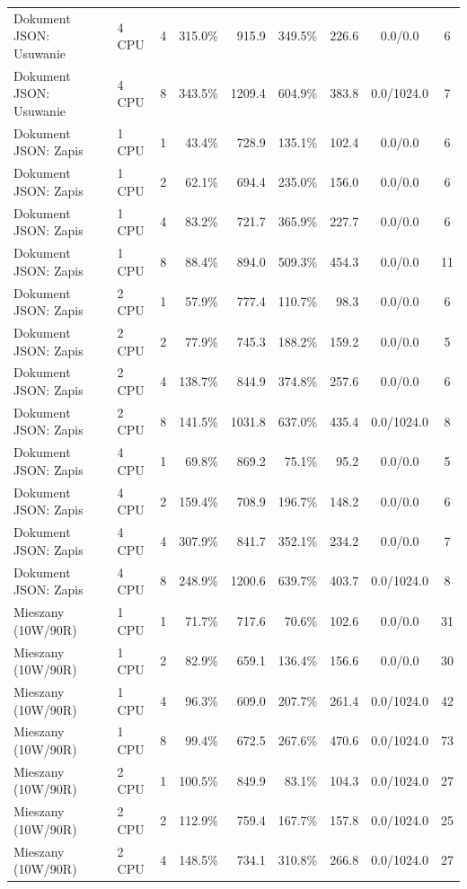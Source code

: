 \begin{table}[ht]
{\begin{tabular}{llcrrrrcc}
Dokument JSON: Usuwanie & 4 CPU & 4 & 315.0\% & 915.9 & 349.5\% & 226.6 & 0.0/0.0 & 6 \\
Dokument JSON: Usuwanie & 4 CPU & 8 & 343.5\% & 1209.4 & 604.9\% & 383.8 & 0.0/1024.0 & 7 \\
Dokument JSON: Zapis & 1 CPU & 1 & 43.4\% & 728.9 & 135.1\% & 102.4 & 0.0/0.0 & 6 \\
Dokument JSON: Zapis & 1 CPU & 2 & 62.1\% & 694.4 & 235.0\% & 156.0 & 0.0/0.0 & 6 \\
Dokument JSON: Zapis & 1 CPU & 4 & 83.2\% & 721.7 & 365.9\% & 227.7 & 0.0/0.0 & 6 \\
Dokument JSON: Zapis & 1 CPU & 8 & 88.4\% & 894.0 & 509.3\% & 454.3 & 0.0/0.0 & 11 \\
Dokument JSON: Zapis & 2 CPU & 1 & 57.9\% & 777.4 & 110.7\% & 98.3 & 0.0/0.0 & 6 \\
Dokument JSON: Zapis & 2 CPU & 2 & 77.9\% & 745.3 & 188.2\% & 159.2 & 0.0/0.0 & 5 \\
Dokument JSON: Zapis & 2 CPU & 4 & 138.7\% & 844.9 & 374.8\% & 257.6 & 0.0/0.0 & 6 \\
Dokument JSON: Zapis & 2 CPU & 8 & 141.5\% & 1031.8 & 637.0\% & 435.4 & 0.0/1024.0 & 8 \\
Dokument JSON: Zapis & 4 CPU & 1 & 69.8\% & 869.2 & 75.1\% & 95.2 & 0.0/0.0 & 5 \\
Dokument JSON: Zapis & 4 CPU & 2 & 159.4\% & 708.9 & 196.7\% & 148.2 & 0.0/0.0 & 6 \\
Dokument JSON: Zapis & 4 CPU & 4 & 307.9\% & 841.7 & 352.1\% & 234.2 & 0.0/0.0 & 7 \\
Dokument JSON: Zapis & 4 CPU & 8 & 248.9\% & 1200.6 & 639.7\% & 403.7 & 0.0/1024.0 & 8 \\
Mieszany (10W/90R) & 1 CPU & 1 & 71.7\% & 717.6 & 70.6\% & 102.6 & 0.0/0.0 & 31 \\
Mieszany (10W/90R) & 1 CPU & 2 & 82.9\% & 659.1 & 136.4\% & 156.6 & 0.0/0.0 & 30 \\
Mieszany (10W/90R) & 1 CPU & 4 & 96.3\% & 609.0 & 207.7\% & 261.4 & 0.0/1024.0 & 42 \\
Mieszany (10W/90R) & 1 CPU & 8 & 99.4\% & 672.5 & 267.6\% & 470.6 & 0.0/1024.0 & 73 \\
Mieszany (10W/90R) & 2 CPU & 1 & 100.5\% & 849.9 & 83.1\% & 104.3 & 0.0/1024.0 & 27 \\
Mieszany (10W/90R) & 2 CPU & 2 & 112.9\% & 759.4 & 167.7\% & 157.8 & 0.0/1024.0 & 25 \\
Mieszany (10W/90R) & 2 CPU & 4 & 148.5\% & 734.1 & 310.8\% & 266.8 & 0.0/1024.0 & 27 \\

\end{tabular}}
\end{table}
